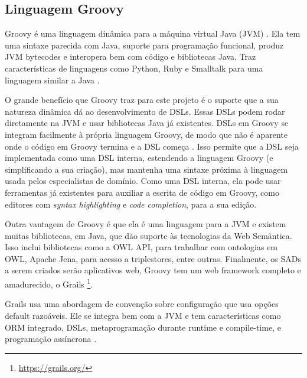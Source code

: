 \subsection*{Linguagem \foreignlanguage{english}{Groovy}}

%
Groovy\foreignlanguage{brazil}{ é uma linguagem dinâmica para a máquina
virtual Java (}JVM\foreignlanguage{brazil}{) \citep{koenig2007groovy}.
Ela tem uma sintaxe parecida com Java, suporte para programação funcional,
produz }JVM bytecodes\foreignlanguage{brazil}{ e interopera bem com
código e bibliotecas Java. Traz características de linguagens como
}Python\foreignlanguage{brazil}{, }Ruby\foreignlanguage{brazil}{ e
}Smalltalk\foreignlanguage{brazil}{ para uma linguagem similar a Java
\citep{koenig2007groovy}.}

%
O grande benefício que \foreignlanguage{english}{Groovy} traz para
este projeto é o suporte que a sua natureza dinâmica dá ao desenvolvimento
de DSLs. Essas DSLs podem rodar diretamente na \foreignlanguage{english}{JVM}
e usar bibliotecas Java já existentes. DSLs em \foreignlanguage{english}{Groovy}
se integram facilmente à própria linguagem Groovy, de modo que não
é aparente onde o código em \foreignlanguage{english}{Groovy} termina
e a DSL começa \citep{dearle2015groovy}. Isso permite que a DSL seja
implementada como uma DSL interna, estendendo a linguagem Groovy (e
simplificando a sua criação), mas mantenha uma sintaxe próxima à linguagem
usada pelos especialistas de domínio. Como uma DSL interna, ela pode
usar ferramentas já existentes para auxiliar a escrita de código em
Groovy, como editores com \foreignlanguage{english}{\textit{syntax
highlighting}} e \foreignlanguage{english}{\textit{code completion}},
para a sua edição.

Outra vantagem de Groovy é que ela é uma linguagem para a \foreignlanguage{english}{JVM}
e existem muitas bibliotecas, em Java, que dão suporte às tecnologias
da Web Semântica. Isso inclui bibliotecas como a \foreignlanguage{english}{OWL
API}, para trabalhar com ontologias em \foreignlanguage{english}{OWL},
Apache \foreignlanguage{english}{Jena}, para acesso a \foreignlanguage{english}{triplestores},
entre outras. Finalmente, os SADs a serem criados serão aplicativos
web, Groovy tem um web framework completo e amadurecido, o Grails\foreignlanguage{english}{
}\footnote{%
\url{https://grails.org/}%
}. 

Grails usa uma abordagem de convenção sobre configuração que usa opções
default razoáveis. Ele se integra bem com a JVM e tem características
como ORM integrado, DSLs, metaprogramação durante runtime e compile-time,
e programação assíncrona \citep{smith2009grails}.

